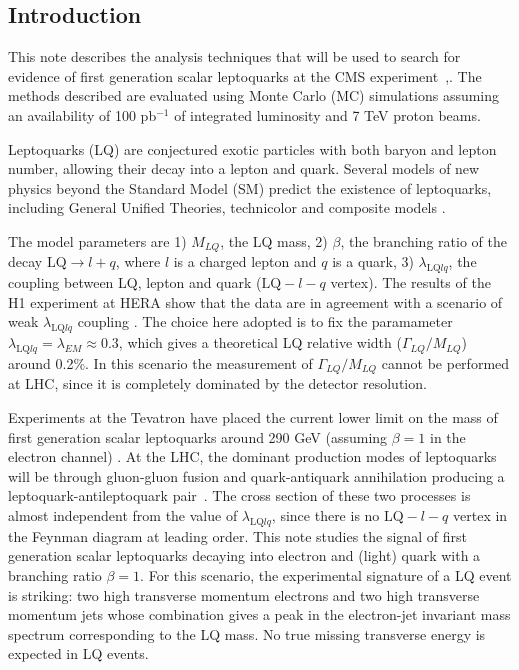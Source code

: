 \documentclass{cmspaper}
\begin{document}
\begin{linenumbers}
\setcounter{page}{2}%

\section{Introduction}
 
This note describes the analysis techniques that will be used to search for evidence of first generation scalar leptoquarks 
at the CMS experiment~\cite{CMSTDR1},\cite{CMSTDR2}. The methods described are evaluated using Monte Carlo (MC) simulations assuming an availability of 
100 pb$^{-1}$ of integrated luminosity and 7 TeV proton beams.

Leptoquarks (LQ) are conjectured exotic particles with both baryon and lepton number, allowing their decay into a lepton and quark.  
Several models of new physics beyond the Standard Model (SM) predict the existence of leptoquarks, including General Unified Theories, 
technicolor and composite models \cite{theories}.  

The model parameters are 1) $M_{LQ}$, the LQ mass, 2) $\beta$, the branching ratio of the decay 
$\mbox{LQ} \rightarrow l + q$, where $l$ is a charged lepton and $q$ is a quark, 
3) $\lambda_{\mbox{LQ}lq}$, the coupling between LQ, lepton and quark ($\mbox{LQ}-l-q$ vertex). 
The results of the H1 experiment at HERA show that the data are in agreement with a scenario of weak 
$\lambda_{\mbox{LQ}lq}$ coupling \cite{hera}. The choice here adopted
is to fix the paramameter $\lambda_{\mbox{LQ}lq} = \lambda_{EM} \approx 0.3$, which gives 
a theoretical LQ relative width ($\Gamma_{LQ}/M_{LQ}$) around 0.2\%. 
In this scenario the measurement of $\Gamma_{LQ}/M_{LQ}$ cannot be performed at LHC, since it is completely dominated by the detector resolution.  

Experiments at the Tevatron have placed the current lower limit on the mass of first generation scalar 
leptoquarks around 290 GeV (assuming $\beta=1$ in the electron channel) \cite{d02008}.
At the LHC, the dominant production modes of leptoquarks will be through gluon-gluon fusion and 
quark-antiquark annihilation producing a leptoquark-antileptoquark pair~\cite{Kramer}. 
The cross section of these two processes is almost independent from the value of 
$\lambda_{\mbox{LQ}lq}$, since there is no $\mbox{LQ}-l-q$ vertex in the Feynman diagram 
at leading order. This note studies the signal of first generation scalar leptoquarks decaying into electron and 
(light) quark with a branching ratio $\beta=1$. 
For this scenario, the experimental signature of a LQ event is striking: two 
high transverse momentum electrons and two high transverse momentum jets 
whose combination gives a peak in the electron-jet invariant mass 
spectrum corresponding to the LQ mass. No true missing transverse energy is expected in LQ events.


\end{linenumbers}
\end{document}
